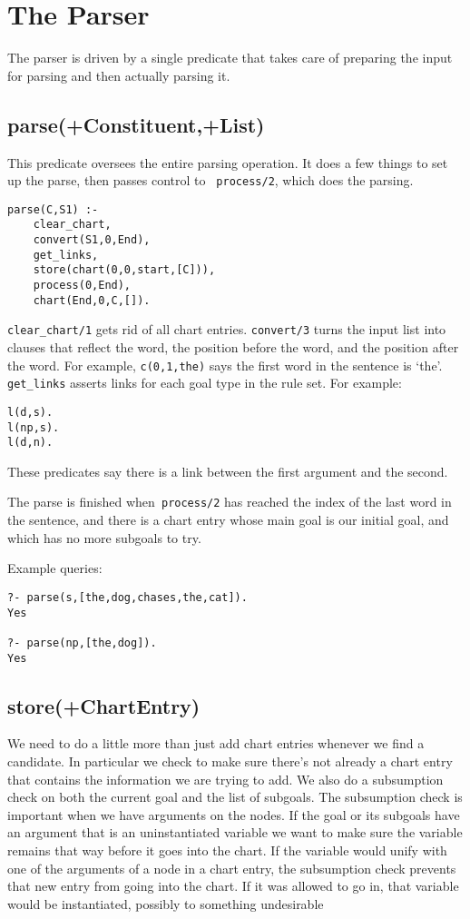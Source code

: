\documentclass[12pt]{article}
\begin{document}
\section{The Parser}
The parser is driven by a single predicate that takes care of preparing the input for parsing and then actually parsing it.

\subsection{parse(+Constituent,+List)}
This predicate oversees the entire parsing operation.  It does a few things to set up the parse, then passes control to \verb| process/2|, which does the parsing.

\begin{verbatim}
parse(C,S1) :-
    clear_chart,
    convert(S1,0,End),
    get_links,
    store(chart(0,0,start,[C])),
    process(0,End),
    chart(End,0,C,[]).
\end{verbatim}

\verb|clear_chart/1| gets rid of all chart entries. \verb|convert/3| turns the input list into clauses that reflect the word, the position before the word, and the position after the word.  For example, \verb|c(0,1,the)| says the first word in the sentence is `the'. \verb|get_links| asserts links for each goal type in the rule set. For example:
\begin{verbatim}
l(d,s).
l(np,s).
l(d,n).
\end{verbatim}
These predicates say there is a link between the first argument and the second.

The parse is finished when\verb| process/2| has reached the index of the last word in the sentence, and there is a chart entry whose main goal is our initial goal, and which has no more subgoals to try.

Example queries:
\begin{verbatim}
?- parse(s,[the,dog,chases,the,cat]).
Yes

?- parse(np,[the,dog]).
Yes
\end{verbatim}

\subsection{store(+ChartEntry)}
We need to do a little more than just add chart entries whenever we find a candidate.  In particular we check to make sure there's not already a chart entry that contains the information we are trying to add.  We also do a subsumption check on both the current goal and the list of subgoals.  The subsumption check is important when we have arguments on the nodes.  If the goal or its subgoals have an argument that is an uninstantiated variable we want to make sure the variable remains that way before it goes into the chart.  If the variable would unify with one of the arguments of a node in a chart entry, the subsumption check prevents that new entry from going into the chart. If it was allowed to go in, that variable would be instantiated, possibly to something undesirable
\end{document}
